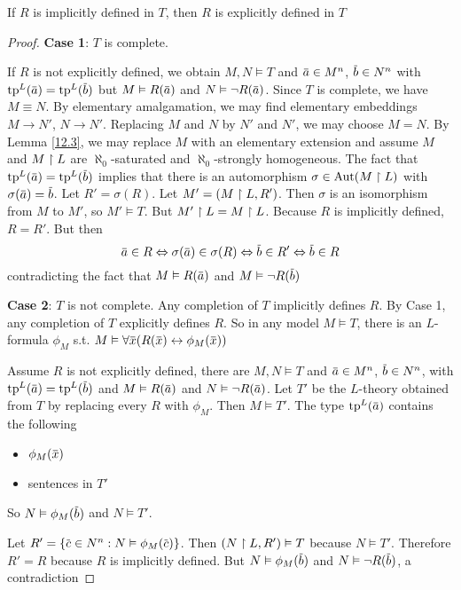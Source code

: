 \documentclass[11pt]{article}
\begin{document}
\begin{theorem}[beth]
If \(R\) is implicitly defined in \(T\), then \(R\) is explicitly defined in \(T\)
\end{theorem}

\begin{proof}
\textbf{Case 1}: \(T\) is complete.

If \(R\) is not explicitly defined, we obtain \(M,N\vDash T\) and \(\bara\in M^n\), \(\barb\in N^n\)
with \(\tp^L(\bara)=\tp^L(\barb)\) but \(M\vDash R(\bara)\) and \(N\vDash\neg R(\bara)\). Since \(T\) is
complete, we have \(M\equiv N\). By elementary amalgamation, we may find elementary
embeddings \(M\to N'\), \(N\to N'\). Replacing \(M\) and \(N\) by \(N'\) and \(N'\), we may
choose \(M=N\). By Lemma \ref{12.3}, we may replace \(M\) with an elementary extension and
assume \(M\) and \(M\upharpoonright L\) are \(\aleph_0\)-saturated and \(\aleph_0\)-strongly homogeneous. The fact
that \(\tp^L(\bara)=\tp^L(\barb)\) implies that there is an automorphism \(\sigma\in\operatorname{\text{Aut}}(M\upharpoonright L)\) with
\(\sigma(\bara)=\barb\). Let \(R'=\sigma(R)\). Let \(M'=(M\upharpoonright L,R')\). Then \(\sigma\) is an isomorphism
from \(M\) to \(M'\), so \(M'\vDash T\). But \(M'\upharpoonright L=M\upharpoonright L\). Because \(R\) is implicitly
defined, \(R=R'\). But then
\begin{equation*}
\bara\in R\Leftrightarrow\sigma(\bara)\in\sigma(R)\Leftrightarrow\barb\in R'\Leftrightarrow\barb\in R
\end{equation*}
contradicting the fact that \(M\vDash R(\bara)\) and \(M\vDash\neg R(\barb)\)

\textbf{Case 2}: \(T\) is not complete. Any completion of \(T\) implicitly defines \(R\). By Case 1, any
completion of \(T\) explicitly defines \(R\). So in any model \(M\vDash T\), there is
an \(L\)-formula \(\phi_M\) s.t. \(M\vDash\forall\barx(R(\barx)\leftrightarrow\phi_M(\barx))\)

Assume \(R\) is not explicitly defined, there are \(M,N\vDash T\) and \(\bara\in M^n\), \(\barb\in N^n\),
with \(\tp^L(\bara)=\tp^L(\barb)\) and \(M\vDash R(\bara)\) and \(N\vDash\neg R(\bara)\). Let \(T'\) be the
\(L\)-theory obtained from \(T\) by replacing every \(R\) with \(\phi_M\). Then \(M\vDash T'\). The
type \(\tp^L(\bara)\) contains the following
\begin{itemize}
\item \(\phi_M(\barx)\)
\item sentences in \(T'\)
\end{itemize}


So \(N\vDash\phi_M(\barb)\) and \(N\vDash T'\).

Let \(R'=\{\barc\in N^n:N\vDash\phi_M(\barc)\}\). Then \((N\upharpoonright L,R')\vDash T\) because \(N\vDash T'\).
Therefore \(R'=R\) because \(R\) is implicitly defined. But \(N\vDash\phi_M(\barb)\)
and \(N\vDash\neg R(\barb)\), a contradiction
\end{proof}
\end{document}
